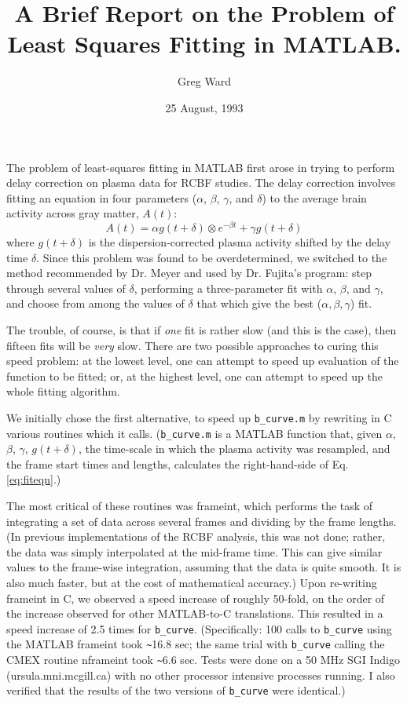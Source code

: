\documentclass[12pt]{article}
\title{A Brief Report on the Problem of Least Squares Fitting in MATLAB.}
\author{Greg Ward}
\date{25 August, 1993}
\begin{document}
\maketitle

The problem of least-squares fitting in MATLAB first arose in trying
to perform delay correction on plasma data for RCBF studies.  The
delay correction involves fitting an equation in four parameters
($\alpha$, $\beta$, $\gamma$, and $\delta$) to the average brain
activity across gray matter, $A(t)$:
\begin{equation}
A(t) = \alpha g(t+\delta) \otimes e^{-\beta t} + \gamma g(t+\delta)
\label{eq:fiteqn}
\end{equation}
where $g(t+\delta)$ is the dispersion-corrected plasma activity
shifted by the delay time $\delta$.  Since this problem was found to
be overdetermined, we switched to the method recommended by Dr. Meyer
and used by Dr. Fujita's program: step through several values of
$\delta$, performing a three-parameter fit with $\alpha$, $\beta$, and
$\gamma$, and choose from among the values of $\delta$ that which give
the best ($\alpha, \beta, \gamma$) fit.

The trouble, of course, is that if {\em one} fit is rather slow (and
this is the case), then fifteen fits will be {\em very} slow.  There
are two possible approaches to curing this speed problem: at the
lowest level, one can attempt to speed up evaluation of the function
to be fitted; or, at the highest level, one can attempt to speed up
the whole fitting algorithm.

We initially chose the first alternative, to speed up \verb|b_curve.m|
by rewriting in C various routines which it calls.  (\verb|b_curve.m|
is a MATLAB function that, given $\alpha$, $\beta$, $\gamma$,
$g(t+\delta)$, the time-scale in which the plasma activity was
resampled, and the frame start times and lengths, calculates the
right-hand-side of Eq. \ref{eq:fiteqn}.)

The most critical of these routines was frameint, which performs the
task of integrating a set of data across several frames and dividing
by the frame lengths.  (In previous implementations of the RCBF
analysis, this was not done; rather, the data was simply interpolated
at the mid-frame time.  This can give similar values to the frame-wise
integration, assuming that the data is quite smooth.  It is also much
faster, but at the cost of mathematical accuracy.)  Upon re-writing
frameint in C, we observed a speed increase of roughly 50-fold, on the
order of the increase observed for other MATLAB-to-C translations.
This resulted in a speed increase of 2.5 times for
\verb|b_curve|.  (Specifically: 100 calls to \verb|b_curve| using the
MATLAB frameint took \verb|~|16.8 sec; the same trial with
\verb|b_curve| calling the CMEX routine nframeint took \verb|~|6.6 sec.
Tests were done on a 50 MHz SGI Indigo (ursula.mni.mcgill.ca) with no
other processor intensive processes running.  I also verified that the
results of the two versions of
\verb|b_curve| were identical.)
\end{document}
